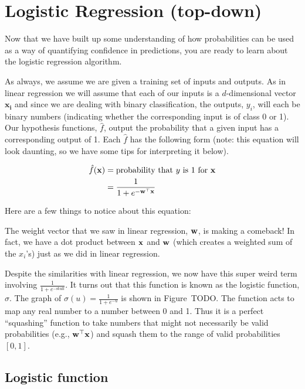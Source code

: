 \documentclass[assignment03_Solutions]{subfiles}
\begin{document}
\section{Logistic Regression (top-down)}
Now that we have built up some understanding of how probabilities can be used as a way of quantifying confidence in predictions, you are ready to learn about the logistic regression algorithm.

As always, we assume we are given a training set of inputs and outputs.  As in linear regression we will assume that each of our inputs is a $d$-dimensional vector $\mathbf{x_i}$ and since we are dealing with binary classification, the outputs, $y_i$, will each be binary numbers (indicating whether the corresponding input is of class 0 or 1).  Our hypothesis functions, $\hat{f}$, output the probability that a given input has a corresponding output of 1.  Each $\hat{f}$ has the following form (note: this equation will look daunting, so we have some tips for interpreting it below).

\begin{align}
\hat{f}(\mathbf{x}) &= \mbox{probability that $y$ is 1 for $\mathbf{x}$} \nonumber \\
&=\frac{1}{1 + e^{-\mathbf{w}^\top \mathbf{x}}}
\end{align}

Here are a few things to notice about this equation:
\be
\item The weight vector that we saw in linear regression, $\mathbf{w}$, is making a comeback!  In fact, we have a dot product between $\mathbf{x}$ and $\mathbf{w}$ (which creates a weighted sum of the $x_i$'s) just as we did in linear regression.
\item Despite the similarities with linear regression, we now have this super weird term involving $\frac{1}{1+e^{-\mbox{stuff}}}$.  It turns out that this function is known as the logistic function, $\sigma$.  The graph of $\sigma(u) = \frac{1}{1+e^{-u}}$ is shown in Figure~TODO.  The function acts to map any real number to a number between 0 and 1.  Thus it is a perfect ``squashing'' function to take numbers that might not necessarily be valid probabilities (e.g., $\mathbf{w}^\top \mathbf{x}$) and squash them to the range of valid probabilities $[0,1]$.
\ee



\subsection{Logistic function}
\end{document}
